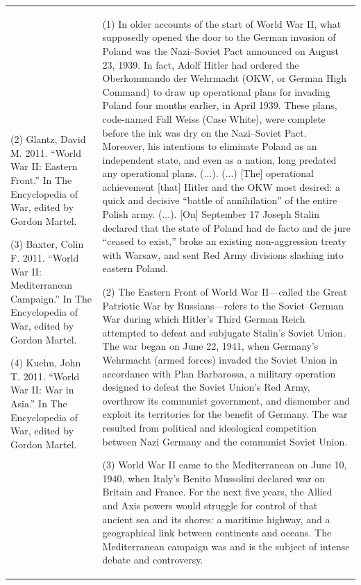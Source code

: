{\begin{longtable}{p{}p{}}
(2) Glantz, David M. 2011. “World War II: Eastern Front.” In The Encyclopedia of War, edited by Gordon Martel.

(3) Baxter, Colin F. 2011. “World War II: Mediterranean Campaign.” In The Encyclopedia of War, edited by Gordon Martel.

(4) Kuehn, John T. 2011. “World War II: War in Asia.” In The Encyclopedia of War, edited by Gordon Martel. & (1) In older accounts of the start of World War II, what supposedly opened the door to the German invasion of Poland was the Nazi–Soviet Pact announced on August 23, 1939. In fact, Adolf Hitler had ordered the Oberkommando der Wehrmacht (OKW, or German High Command) to draw up operational plans for invading Poland four months earlier, in April 1939. These plans, code-named Fall Weiss (Case White), were complete before the ink was dry on the Nazi–Soviet Pact. Moreover, his intentions to eliminate Poland as an independent state, and even as a nation, long predated any operational plans. (...). (...) [The] operational achievement [that] Hitler and the OKW most desired: a quick and decisive “battle of annihilation” of the entire Polish army. (...). 
[On] September 17 Joseph Stalin declared that the state of Poland had de facto and de jure “ceased to exist,” broke an existing non-aggression treaty with Warsaw, and sent Red Army divisions slashing into eastern Poland.

(2) The Eastern Front of World War II—called the Great Patriotic War by Russians—refers to the Soviet–German War during which Hitler's Third German Reich attempted to defeat and subjugate Stalin's Soviet Union. The war began on June 22, 1941, when Germany's Wehrmacht (armed forces) invaded the Soviet Union in accordance with Plan Barbarossa, a military operation designed to defeat the Soviet Union's Red Army, overthrow its communist government, and dismember and exploit its territories for the benefit of Germany. The war resulted from political and ideological competition between Nazi Germany and the communist Soviet Union.

(3) World War II came to the Mediterranean on June 10, 1940, when Italy's Benito Mussolini declared war on Britain and France. For the next five years, the Allied and Axis powers would struggle for control of that ancient sea and its shores: a maritime highway, and a geographical link between continents and oceans. The Mediterranean campaign was and is the subject of intense debate and controversy.


\end{longtable}}
